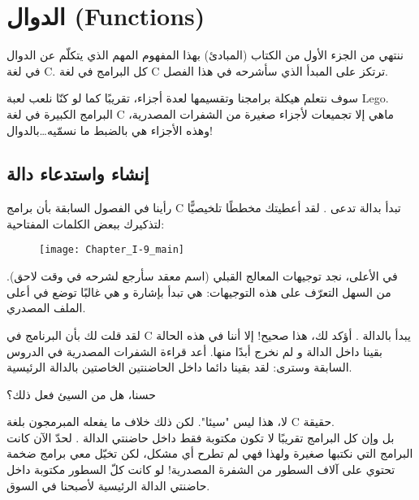 \chapter{الدوال (\textenglish{Functions})}

ننتهي من الجزء الأول من الكتاب (المبادئ) بهذا المفهوم المهم الذي يتكلّم عن الدوال في لغة
\textenglish{C}.
كل البرامج في لغة  
\textenglish{C}
ترتكز على المبدأ الذي سأشرحه في هذا الفصل.

سوف نتعلم هيكلة برامجنا وتقسيمها لعدة أجزاء، تقريبًا كما لو كنّا نلعب لعبة
\textenglish{Lego}.\\
البرامج الكبيرة في لغة 
\textenglish{C}
ماهي إلا تجميعات لأجزاء صغيرة من الشفرات المصدرية، وهذه الأجزاء هي بالضبط ما نسمّيه\dots بالدوال!

\section{إنشاء واستدعاء دالة}

رأينا في الفصول السابقة بأن برامج \textenglish{C}
تبدأ بدالة تدعى 
.
لقد أعطيتك مخططًا تلخيصيًّا لتذكيرك ببعض الكلمات المفتاحية:

\begin{figure}[H]
	\centering
	\texttt{[image: Chapter\_I-9\_main]}
\end{figure}

في الأعلى، نجد توجيهات المعالج القبلي (اسم معقد سأرجع لشرحه في وقت لاحق). من السهل التعرّف على هذه التوجيهات: هي تبدأ بإشارة 
\InlineCode{\#}
و هي غالبًا توضع في أعلى الملف المصدري.

لقد قلت لك بأن البرنامج في \textenglish{C}
يبدأ بالدالة
.
 أؤكد لك، هذا صحيح! إلا أننا في هذه الحالة بقينا داخل الدالة 
و لم نخرج أبدًا منها. أعد قراءة الشفرات المصدرية في الدروس السابقة وسترى: لقد بقينا دائما داخل الحاضنتين الخاصتين بالدالة الرئيسية.

\begin{question}
حسنا، هل من السيئ فعل ذلك؟
\end{question}

لا، هذا ليس "سيئا". لكن ذلك خلاف ما يفعله المبرمجون بلغة
\textenglish{C}
حقيقة.\\
بل وإن كل البرامج تقريبًا لا تكون مكتوبة فقط داخل  حاضنتي الدالة 
.
لحدّ الآن كانت البرامج التي نكتبها صغيرة ولهذا فهي لم تطرح أي مشكل، لكن تخيّل معي برامج ضخمة تحتوي على آلاف السطور من الشفرة المصدرية! لو كانت كلّ السطور مكتوبة داخل حاضنتي الدالة الرئيسية لأصبحنا في السوق.

